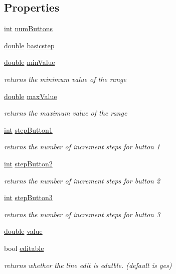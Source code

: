 \subsection*{Properties}
\begin{DoxyCompactItemize}
\item 
\hyperlink{ioapi_8h_a787fa3cf048117ba7123753c1e74fcd6}{int} \hyperlink{class_qwt_counter_a6a07ff0c9612ae4fb8a4acbb4466c0b6}{num\-Buttons}
\item 
\hyperlink{_super_l_u_support_8h_a8956b2b9f49bf918deed98379d159ca7}{double} \hyperlink{class_qwt_counter_a810180900cea7cd2fec2918051852505}{basicstep}
\item 
\hyperlink{_super_l_u_support_8h_a8956b2b9f49bf918deed98379d159ca7}{double} \hyperlink{class_qwt_counter_a7db2ffbdab4216c83f95fb41c89e8c53}{min\-Value}
\begin{DoxyCompactList}\small\item\em returns the minimum value of the range \end{DoxyCompactList}\item 
\hyperlink{_super_l_u_support_8h_a8956b2b9f49bf918deed98379d159ca7}{double} \hyperlink{class_qwt_counter_a5011e951134590d174a824385e5fb2ae}{max\-Value}
\begin{DoxyCompactList}\small\item\em returns the maximum value of the range \end{DoxyCompactList}\item 
\hyperlink{ioapi_8h_a787fa3cf048117ba7123753c1e74fcd6}{int} \hyperlink{class_qwt_counter_a4cee5a93ef787068ed5b63bcb55167f6}{step\-Button1}
\begin{DoxyCompactList}\small\item\em returns the number of increment steps for button 1 \end{DoxyCompactList}\item 
\hyperlink{ioapi_8h_a787fa3cf048117ba7123753c1e74fcd6}{int} \hyperlink{class_qwt_counter_a3bf49238a71fc0edd6d7259a902997a5}{step\-Button2}
\begin{DoxyCompactList}\small\item\em returns the number of increment steps for button 2 \end{DoxyCompactList}\item 
\hyperlink{ioapi_8h_a787fa3cf048117ba7123753c1e74fcd6}{int} \hyperlink{class_qwt_counter_ae484def1d66d3fb1c720e4ee4a67c512}{step\-Button3}
\begin{DoxyCompactList}\small\item\em returns the number of increment steps for button 3 \end{DoxyCompactList}\item 
\hyperlink{_super_l_u_support_8h_a8956b2b9f49bf918deed98379d159ca7}{double} \hyperlink{class_qwt_counter_a6f98bf5e2110835ce0c00425e682b7e2}{value}
\item 
bool \hyperlink{class_qwt_counter_a3fb541ce259dceef47e927cc697f739c}{editable}
\begin{DoxyCompactList}\small\item\em returns whether the line edit is edatble. (default is yes) \end{DoxyCompactList}\end{DoxyCompactItemize}


